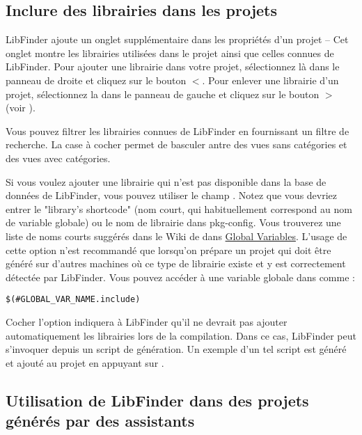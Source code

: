 \subsection{Inclure des librairies dans les projets}

LibFinder ajoute un onglet supplémentaire dans les propriétés d'un projet  -- Cet onglet montre les librairies utilisées dans le projet ainsi que celles connues de LibFinder. Pour ajouter une librairie dans votre projet, sélectionnez là dans le panneau de droite et cliquez sur le bouton $<$. Pour enlever une librairie d'un projet, sélectionnez la dans le panneau de gauche et cliquez sur le bouton $>$ (voir ).


Vous pouvez filtrer les librairies connues de LibFinder en fournissant un filtre de recherche. La case à cocher   permet de basculer antre des vues sans catégories et des vues avec catégories.

Si vous voulez ajouter une librairie qui n'est pas disponible dans la base de données de LibFinder, vous pouvez utiliser le champ . Notez que vous devriez entrer le "library's shortcode" (nom court, qui habituellement correspond au nom de variable globale) ou le nom de librairie dans pkg-config. Vous trouverez une liste de noms courts suggérés dans le Wiki de \codeblocks dans \href{http://wiki.codeblocks.org/index.php?title=Recommended_global_variables}{Global Variables}. L'usage de cette option n'est recommandé que lorsqu'on prépare un projet qui doit être généré sur d'autres machines où ce type de librairie existe et y est correctement détectée par LibFinder. Vous pouvez accéder à une variable globale dans \codeblocks comme :

\begin{lstlisting}
$(#GLOBAL_VAR_NAME.include)
\end{lstlisting}

Cocher l'option  indiquera à LibFinder qu'il ne devrait pas ajouter automatiquement les librairies lors de la compilation. Dans ce cas, LibFinder peut s'invoquer depuis un script de génération. Un exemple d'un tel script est généré et ajouté au projet en appuyant sur  .

\subsection{Utilisation de LibFinder dans des projets générés par des assistants}

